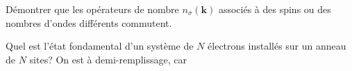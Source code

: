 \documentclass{subfiles}[../main.tex]
\begin{document}
            \begin{problem}
                Démontrer que les opérateurs de nombre
                $n_\sigma(\bm{k})$ associés à des spins ou
                des nombres d'ondes différents commutent.
            \end{problem}

            \begin{problem}
                Quel est l'état fondamental d'un système de
                $N$ électrons installés sur un anneau de
                $N$ sites? On est à demi-remplissage, car

            \end{problem}




\end{document}
